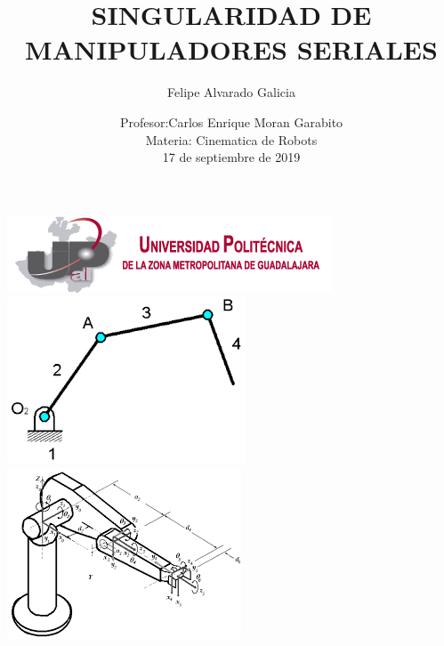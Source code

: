 \documentclass[12pt,a4paper]{article}
\author{Felipe Alvarado Galicia}
\title{SINGULARIDAD DE MANIPULADORES SERIALES}
\date{Profesor:Carlos Enrique Moran Garabito\\
Materia: Cinematica de Robots\\
17 de septiembre de 2019}
\begin{document}
\maketitle
 \includegraphics[scale=1]{logo1.png}\\
\includegraphics[scale=1]{imag5.png} 
\includegraphics[scale=1]{imag8.png}\\\\\\\\\\\\\\\\\\\\\\\\\\\\\\\\\\\\\\\\\\\\\\
\end{document}
